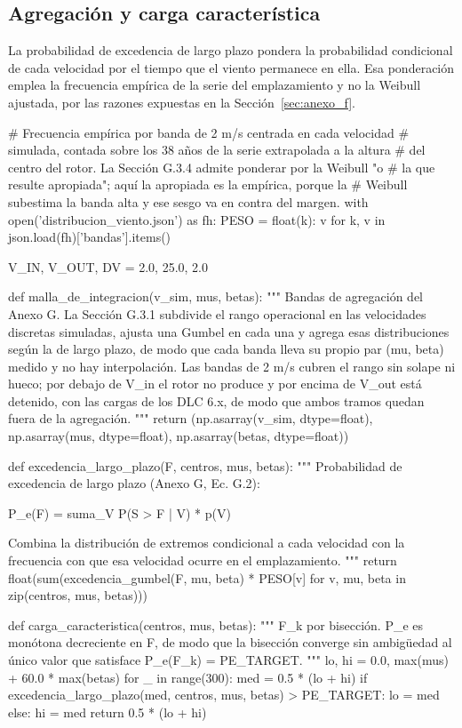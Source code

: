 \subsection*{Agregación y carga característica}

La probabilidad de excedencia de largo plazo pondera la probabilidad condicional de cada velocidad por el tiempo que el viento permanece en ella. Esa ponderación emplea la frecuencia empírica de la serie del emplazamiento y no la Weibull ajustada, por las razones expuestas en la Sección~\ref{sec:anexo_f}.

\begin{pycode}
# Frecuencia empírica por banda de 2 m/s centrada en cada velocidad
# simulada, contada sobre los 38 años de la serie extrapolada a la altura
# del centro del rotor. La Sección G.3.4 admite ponderar por la Weibull "o
# la que resulte apropiada"; aquí la apropiada es la empírica, porque la
# Weibull subestima la banda alta y ese sesgo va en contra del margen.
with open('distribucion_viento.json') as fh:
    PESO = {float(k): v for k, v in json.load(fh)['bandas'].items()}

V_IN, V_OUT, DV = 2.0, 25.0, 2.0


def malla_de_integracion(v_sim, mus, betas):
    """
    Bandas de agregación del Anexo G. La Sección G.3.1 subdivide el rango
    operacional en las velocidades discretas simuladas, ajusta una Gumbel
    en cada una y agrega esas distribuciones según la de largo plazo, de
    modo que cada banda lleva su propio par (mu, beta) medido y no hay
    interpolación. Las bandas de 2 m/s cubren el rango sin solape ni hueco;
    por debajo de V_in el rotor no produce y por encima de V_out está
    detenido, con las cargas de los DLC 6.x, de modo que ambos tramos
    quedan fuera de la agregación.
    """
    return (np.asarray(v_sim, dtype=float),
            np.asarray(mus, dtype=float),
            np.asarray(betas, dtype=float))


def excedencia_largo_plazo(F, centros, mus, betas):
    """
    Probabilidad de excedencia de largo plazo (Anexo G, Ec. G.2):

        P_e(F) = suma_V  P(S > F | V) * p(V)

    Combina la distribución de extremos condicional a cada velocidad con
    la frecuencia con que esa velocidad ocurre en el emplazamiento.
    """
    return float(sum(excedencia_gumbel(F, mu, beta) * PESO[v]
                     for v, mu, beta in zip(centros, mus, betas)))


def carga_caracteristica(centros, mus, betas):
    """
    F_k por bisección. P_e es monótona decreciente en F, de modo que la
    bisección converge sin ambigüedad al único valor que satisface
    P_e(F_k) = PE_TARGET.
    """
    lo, hi = 0.0, max(mus) + 60.0 * max(betas)
    for _ in range(300):
        med = 0.5 * (lo + hi)
        if excedencia_largo_plazo(med, centros, mus, betas) > PE_TARGET:
            lo = med
        else:
            hi = med
    return 0.5 * (lo + hi)
\end{pycode}

